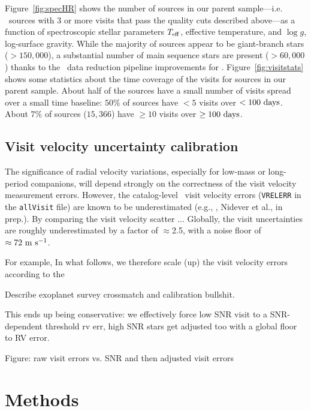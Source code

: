 \documentclass[modern]{aastex62}
\begin{document}
Figure~\ref{fig:specHR} shows the number of sources in our parent sample---i.e.
\apogee\ sources with 3 or more visits that pass the quality cuts described
above---as a function of spectroscopic stellar parameters $T_{\rm eff}$,
effective temperature, and $\log g$, log-surface gravity.
While the majority of sources appear to be giant-branch stars ($>150,000$), a
substantial number of main sequence stars are present ($>60,000$) thanks to the
\apogee\ data reduction pipeline improvements for .
Figure~\ref{fig:visitstats} shows some statistics about the time coverage of the
visits for sources in our parent sample.
About half of the sources have a small number of visits spread over a small time
baseline: $50\%$ of sources have $<5$ visits over $<100~{\rm days}$.
About $7\%$ of sources ($15,366$) have $\geq 10$ visits over $\geq 100~{\rm
days}$.


\subsection{Visit velocity uncertainty calibration} \label{sec:visitcalib}

The significance of radial velocity variations, especially for low-mass or
long-period companions, will depend strongly on the correctness of the visit
velocity measurement errors.
However, the catalog-level \apogee\ visit velocity errors (\texttt{VRELERR} in
the \texttt{allVisit} file) are known to be underestimated (e.g.,
\citealt{Cottaar:2014}, Nidever et al., in prep.).
By comparing the visit velocity scatter ...
Globally, the visit uncertainties are roughly underestimated by a factor of
$\approx$2.5, with a noise floor of $\approx 72~\mathrm{m}~\mathrm{s}^{-1}$.

For example,
In what follows, we therefore scale (up) the visit velocity errors according to the

Describe exoplanet survey crossmatch and calibration bullshit.

This ends up being conservative: we effectively force low SNR visit to a SNR-dependent threshold rv err, high SNR stars get adjusted too with a global floor to RV error.

Figure: raw visit errors vs. SNR and then adjusted visit errors


\section{Methods} \label{sec:methods}
\end{document}
